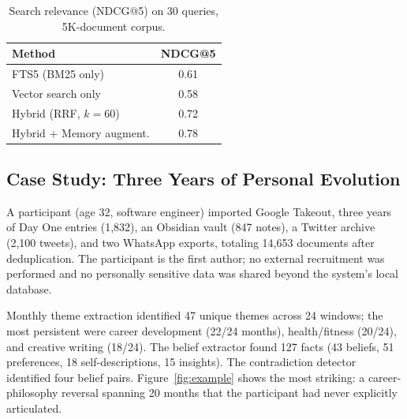 \documentclass[conference]{IEEEtran}
\begin{document}
\begin{table}[t]
\caption{Search relevance (NDCG@5) on 30 queries, 5K-document corpus.}
\label{tab:search}
\footnotesize
\begin{tabular}{lc}
\toprule
\textbf{Method} & \textbf{NDCG@5} \\
\midrule
FTS5 (BM25 only)          & 0.61 \\
Vector search only         & 0.58 \\
Hybrid (RRF, $k{=}60$)    & 0.72 \\
Hybrid + Memory augment.   & 0.78 \\
\bottomrule
\end{tabular}
\end{table}

\subsection{Case Study: Three Years of Personal Evolution}

A participant (age 32, software engineer) imported Google Takeout, three years of Day One entries (1,832), an Obsidian vault (847 notes), a Twitter archive (2,100 tweets), and two WhatsApp exports, totaling 14,653 documents after deduplication. The participant is the first author; no external recruitment was performed and no personally sensitive data was shared beyond the system's local database.

Monthly theme extraction identified 47 unique themes across 24 windows; the most persistent were career development (22/24 months), health/fitness (20/24), and creative writing (18/24). The belief extractor found 127 facts (43 beliefs, 51 preferences, 18 self-descriptions, 15 insights). The contradiction detector identified four belief pairs. Figure~\ref{fig:example} shows the most striking: a career-philosophy reversal spanning 20 months that the participant had never explicitly articulated.
\end{document}
